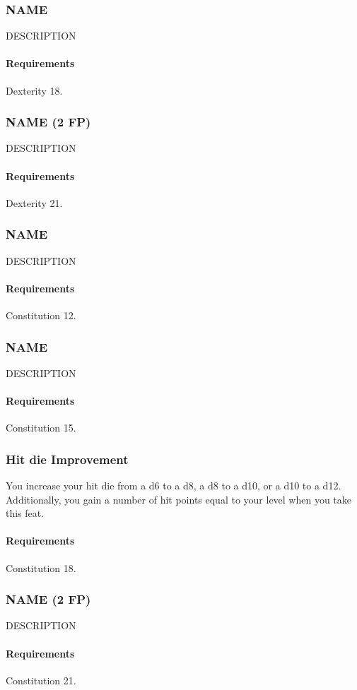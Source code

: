 \subsubsection{NAME} \label{feat::name}
    DESCRIPTION
    \paragraph{Requirements} Dexterity 18.
\subsubsection{NAME (2 FP)} \label{feat::name}
    DESCRIPTION
    \paragraph{Requirements} Dexterity 21.
\subsubsection{NAME} \label{feat::name}
    DESCRIPTION
    \paragraph{Requirements} Constitution 12.
\subsubsection{NAME} \label{feat::name}
    DESCRIPTION
    \paragraph{Requirements} Constitution 15.
\subsubsection{Hit die Improvement} \label{feat::hitdieimprovement}
    You increase your hit die from a d6 to a d8, a d8 to a d10, or a d10 to a d12.
    Additionally, you gain a number of hit points equal to your level when you take this feat.
    \paragraph{Requirements} Constitution 18.
\subsubsection{NAME (2 FP)} \label{feat::name}
    DESCRIPTION
    \paragraph{Requirements} Constitution 21.
